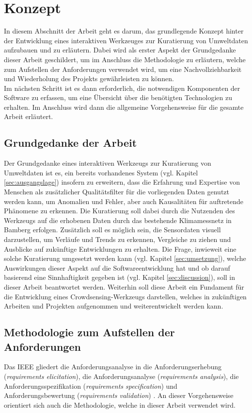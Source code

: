 \chapter{Konzept} %
In diesem Abschnitt der Arbeit geht es darum, das grundlegende Konzept hinter der Entwicklung eines interaktiven Werkzeuges zur Kuratierung von Umweltdaten aufzubauen und zu erläutern. Dabei wird als erster Aspekt der Grundgedanke dieser Arbeit geschildert, um im Anschluss die Methodologie zu erläutern, welche zum Aufstellen der Anforderungen verwendet wird,
um eine Nachvollziehbarkeit und Wiederholung des Projekts gewährleisten zu können. \\ Im nächsten Schritt ist es dann erforderlich, die notwendigen Komponenten der Software zu erfassen, um eine Übersicht über die benötigten Technologien zu erhalten. Im Anschluss wird dann die allgemeine Vorgehensweise für die gesamte Arbeit erläutert.

\section{Grundgedanke der Arbeit}
Der Grundgedanke eines interaktiven Werkzeugs zur Kuratierung von Umweltdaten ist es, ein bereits vorhandenes System (vgl. Kapitel \ref{sec:ausgangslage}) insofern zu erweitern, dass die Erfahrung und Expertise von Menschen als zusätzlicher Qualitätsfilter für die vorliegenden Daten genutzt werden kann, um Anomalien und Fehler, aber auch Kausalitäten für auftretende Phänomene zu erkennen. Die Kuratierung soll dabei durch die Nutzenden des Werkzeugs auf die erhobenen Daten durch das bestehende Klimamessnetz in Bamberg erfolgen. Zusätzlich soll es möglich sein, die Sensordaten visuell darzustellen, um Verläufe und Trends zu erkennen, Vergleiche zu ziehen und Ausblicke auf zukünftige Entwicklungen zu erhalten. Die Frage, inwieweit eine solche Kuratierung umgesetzt werden kann (vgl. Kapitel \ref{sec:umsetzung}), welche Auswirkungen dieser Aspekt auf die Softwareentwicklung hat und ob darauf basierend eine Sinnhaftigkeit gegeben ist (vgl. Kapitel \ref{sec:discussion}), soll in dieser Arbeit beantwortet werden. Weiterhin soll diese Arbeit ein Fundament für die Entwicklung eines Crowdsensing-Werkzeugs darstellen, welches in zukünftigen Arbeiten und Projekten aufgenommen und weiterentwickelt werden kann. 

\section{Methodologie zum Aufstellen der Anforderungen}
Das \ac{IEEE} gliedert die Anforderungsanalyse in die Anforderungserhebung (\textit{requirements elicitation}), die Anforderungsanalyse (\textit{requirements analysis}), die Anforderungsspezifikation (\textit{requirements specification}) und Anforderungsbewertung (\textit{requirements validation}) \cite{ieee2004}. An dieser Vorgehensweise orientiert sich auch die Methodologie, welche in dieser Arbeit verwendet wird.

